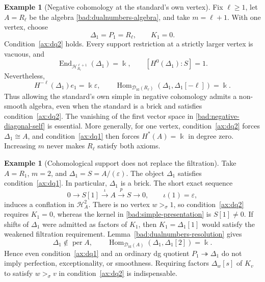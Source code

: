 \documentclass[11pt,a4paper]{article}
\newcommand{\D}{\mathcal D}
\renewcommand{\H}{\mathcal H}
\newcommand{\std}{\Delta}
\DeclareMathOperator{\fd}{fd}
\DeclareMathOperator{\Hom}{Hom}
\DeclareMathOperator{\End}{End}
\DeclareMathOperator{\per}{per}
\theoremstyle{plain}
\theoremstyle{definition}
\newtheorem{example}[theorem]{Example}
\numberwithin{equation}{section}
\begin{document}
\begin{example}[Negative cohomology at the standard's own vertex]
\label{bad:negative-diagonal}
Fix $\ell\geq1$, let $A=R_\ell$ be the algebra
\eqref{bad:dualnumbers-algebra}, and take $m=\ell+1$. With one
vertex, choose
\[
 \std_1=P_1=R_\ell,\qquad K_1=0.
\]
Condition~\ref{ax:dq2} holds. Every support restriction at a strictly
larger vertex is vacuous, and
\[
 \End_{\H_{R_\ell}^{\ell+1}}(\std_1)=\Bbbk,
 \qquad [H^0(\std_1):S]=1.
\]
Nevertheless,
\begin{equation}\label{bad:negative-diagonal-self}
 H^{-\ell}(\std_1)e_1=\Bbbk\varepsilon,
 \qquad
 \Hom_{\D_{\fd}(R_\ell)}(\std_1,\std_1[-\ell])=\Bbbk.
\end{equation}
Thus allowing the standard's own simple in negative cohomology
admits a non-smooth algebra, even when the standard is a brick and
satisfies condition~\ref{ax:dq2}. The vanishing of the first vector
space in \eqref{bad:negative-diagonal-self} is essential.
More generally, for one vertex,
condition~\ref{ax:dq2} forces $\std_1\cong A$, and
condition~\ref{ax:dq1} then forces $H^*(A)=\Bbbk$ in degree zero.
Increasing $m$ never makes $R_\ell$ satisfy both axioms.
\end{example}

\begin{example}[Cohomological support does not replace the filtration]
\label{bad:without-filtration}
Take $A=R_1$, $m=2$, and $\std_1=S=A/(\varepsilon)$.
The object $\std_1$ satisfies condition~\ref{ax:dq1}. In particular,
$\std_1$ is a brick. The short exact sequence
\begin{equation}\label{bad:simple-presentation}
 0\longrightarrow S[1]\xrightarrow{\iota}A
 \xrightarrow{p}S\longrightarrow0,
 \qquad\iota(1)=\varepsilon,
\end{equation}
induces a conflation in $\H_A^2$. There is no vertex $w>_\sigma1$,
so condition~\ref{ax:dq2} requires $K_1=0$, whereas the
kernel in \eqref{bad:simple-presentation} is $S[1]\neq0$.
If shifts of $\std_1$ were admitted as factors of $K_1$, then
$K_1=\std_1[1]$ would
satisfy the weakened filtration requirement.
Lemma~\ref{bad:dualnumbers-resolution} gives
\[
 \std_1\notin\per A,
 \qquad
 \Hom_{\D_{\fd}(A)}(\std_1,\std_1[2])=\Bbbk.
\]
Hence even condition~\ref{ax:dq1} and an ordinary dg quotient
$P_1\twoheadrightarrow\std_1$ do not imply perfection,
exceptionality, or smoothness. Requiring factors $\std_w[s]$ of
$K_v$ to satisfy $w>_\sigma v$ in condition~\ref{ax:dq2} is indispensable.
\end{example}
\end{document}
